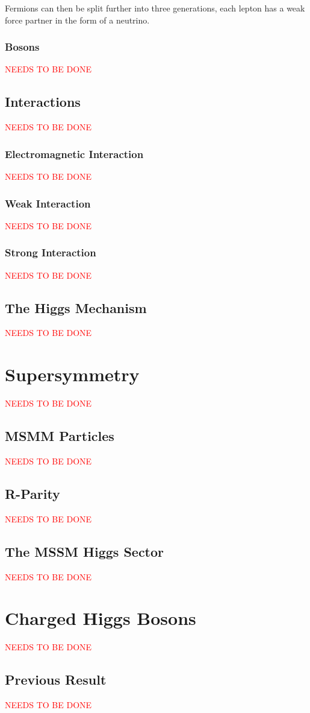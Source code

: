 		Fermions can then be split further into three generations, each lepton has a weak force partner in the form of a neutrino.

		\subsubsection{Bosons}
			\textcolor{red}{NEEDS TO BE DONE}

	\subsection{Interactions}
		\textcolor{red}{NEEDS TO BE DONE}

		\subsubsection{Electromagnetic Interaction}

			\textcolor{red}{NEEDS TO BE DONE}

		\subsubsection{Weak Interaction}
			\textcolor{red}{NEEDS TO BE DONE}

		\subsubsection{Strong Interaction}
			\textcolor{red}{NEEDS TO BE DONE}

	\subsection{The Higgs Mechanism}
		\textcolor{red}{NEEDS TO BE DONE}

\section{Supersymmetry}
	\textcolor{red}{NEEDS TO BE DONE}

	\subsection{MSMM Particles}
		\textcolor{red}{NEEDS TO BE DONE}

	\subsection{R-Parity}
		\textcolor{red}{NEEDS TO BE DONE}

	\subsection{The MSSM Higgs Sector}
		\textcolor{red}{NEEDS TO BE DONE}

\section{Charged Higgs Bosons}
	\textcolor{red}{NEEDS TO BE DONE}

	\subsection{Previous Result}
		\textcolor{red}{NEEDS TO BE DONE}